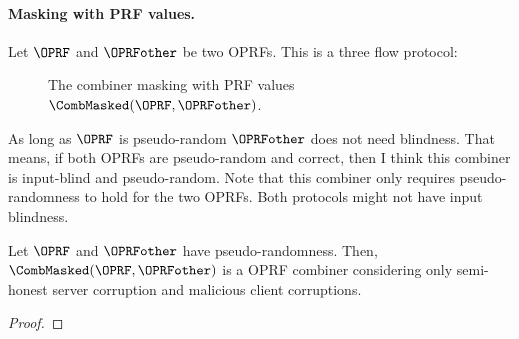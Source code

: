 

\paragraph{Masking with PRF values.}
Let $\OPRF$ and $\OPRFother$ be two OPRFs. This is a three flow protocol:
\begin{figure}
    \centering
    \caption{The combiner masking with PRF values $\CombMasked(\OPRF,\OPRFother)$.}
    \label{fig:combinerMasking}
\end{figure}

As long as $\OPRF$ is pseudo-random $\OPRFother$ does not need blindness.
That means, if both OPRFs are pseudo-random and correct, then I think this combiner is input-blind and pseudo-random.
Note that this combiner only requires pseudo-randomness to hold for the two OPRFs. Both protocols might not have input blindness.
\begin{theorem}
    Let $\OPRF$ and $\OPRFother$ have pseudo-randomness. Then, $\CombMasked(\OPRF,\OPRFother)$ is a OPRF combiner considering only semi-honest server corruption and malicious client corruptions.    
\end{theorem}
\begin{proof}
\end{proof}


